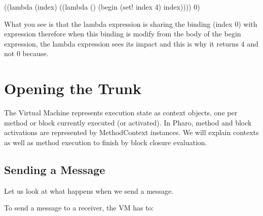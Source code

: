 \documentclass[a4paper,10pt,twoside]{book}
\begin{document}
\begin{code}{}
((lambda (index)
   ((lambda () (begin
                (set! index 4)
                index))))
 0)
\end{code}


What you see is that the lambda expression is sharing the binding (index 0) with expression 
therefore when this binding is modify from the body of the begin expression, the lambda expression sees its impact
and this is why it returns 4 and not 0 because.



\section{Opening the Trunk}
The Virtual Machine represents execution state as context objects, one per method or block currently executed (or activated). In Pharo, method and block activations are represented by MethodContext instances.
We will explain contexts as well as method execution to finish by block closure evaluation.




\subsection{Sending a Message}
Let us look at what happens when we send a message.

To send a message to a receiver, the VM has to:
\end{document}
